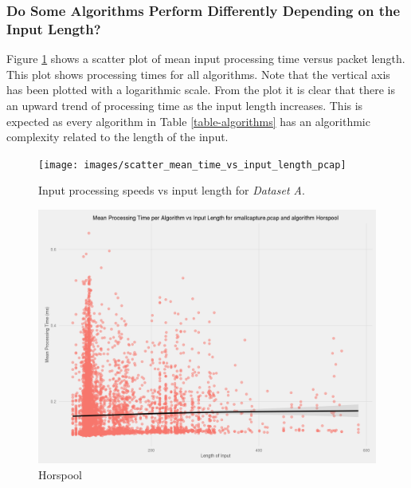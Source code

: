 \documentclass[9pt, technote]{IEEEtran}
\begin{document}
\subsubsection{Do Some Algorithms Perform Differently Depending on the Input Length?}

Figure \ref{figure-speedvslength} shows a scatter plot of mean input processing time versus packet length. This plot shows processing times for all algorithms. Note that the vertical axis has been plotted with a logarithmic scale. From the plot it is clear that there is an upward trend of processing time as the input length increases. This is expected as every algorithm in Table \ref{table-algorithms} has an algorithmic complexity related to the length of the input.

\begin{figure}[!htb]
    \centering
    \texttt{[image: images/scatter\_mean\_time\_vs\_input\_length\_pcap]}
    \caption{Input processing speeds vs input length for \textit{Dataset A}.}
    \label{figure-speedvslength}
\end{figure}

\begin{figure}[!hbt]
  \centering
  \includegraphics[width=\columnwidth]{images/scatter_mean_vs_input_length_Horspool}
  \caption{Horspool}
\end{figure}
\end{document}
